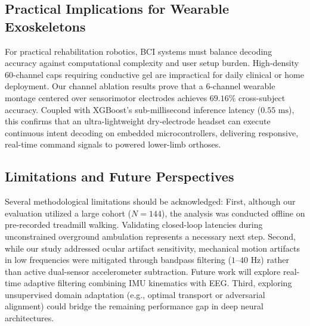 \documentclass[review,12pt]{elsarticle}
\begin{document}
\subsection{Practical Implications for Wearable Exoskeletons}
For practical rehabilitation robotics, BCI systems must balance decoding accuracy against computational complexity and user setup burden. High-density 60-channel caps requiring conductive gel are impractical for daily clinical or home deployment. Our channel ablation results prove that a 6-channel wearable montage centered over sensorimotor electrodes achieves $69.16\%$ cross-subject accuracy. Coupled with XGBoost's sub-millisecond inference latency ($0.55\text{ ms}$), this confirms that an ultra-lightweight dry-electrode headset can execute continuous intent decoding on embedded microcontrollers, delivering responsive, real-time command signals to powered lower-limb orthoses.

\subsection{Limitations and Future Perspectives}
Several methodological limitations should be acknowledged:
First, although our evaluation utilized a large cohort ($N=144$), the analysis was conducted offline on pre-recorded treadmill walking. Validating closed-loop latencies during unconstrained overground ambulation represents a necessary next step.
Second, while our study addressed ocular artifact sensitivity, mechanical motion artifacts in low frequencies were mitigated through bandpass filtering ($1\text{--}40\text{ Hz}$) rather than active dual-sensor accelerometer subtraction. Future work will explore real-time adaptive filtering combining IMU kinematics with EEG.
Third, exploring unsupervised domain adaptation (e.g., optimal transport or adversarial alignment) could bridge the remaining performance gap in deep neural architectures.

\end{document}
